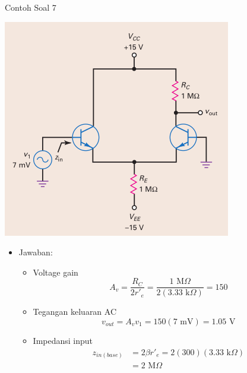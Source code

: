 \documentclass[aspectratio=169]{beamer}
\begin{document}
\begin{frame}{Contoh Soal 7}
	\begin{multicols}{2}
		\begin{center}
			\includegraphics[height=0.7\textheight]{gambar/01.contoh_soal_07}
		\end{center}
		\columnbreak
		\begin{itemize}
			\item Jawaban:
			\begin{itemize}
				\item Voltage gain
				\[ A_v = \frac{R_C}{2r'_e} = \frac{1 \text{ M}\Omega }{2 (3.33 \text{ k}\Omega) } = 150 \]
				\item Tegangan keluaran AC
				\[ v_{out} = A_v v_1 = 150(7 \text{ mV}) = 1.05 \text{ V} \]
				\item Impedansi input
				\begin{align*}
					z_{in(base)} &= 2 \beta r'_e = 2(300)(3.33 \text{ k}\Omega) \\
					&= 2 \text{ M}\Omega
				\end{align*}
			\end{itemize}
		\end{itemize}
	\end{multicols}
\end{frame}
\end{document}
